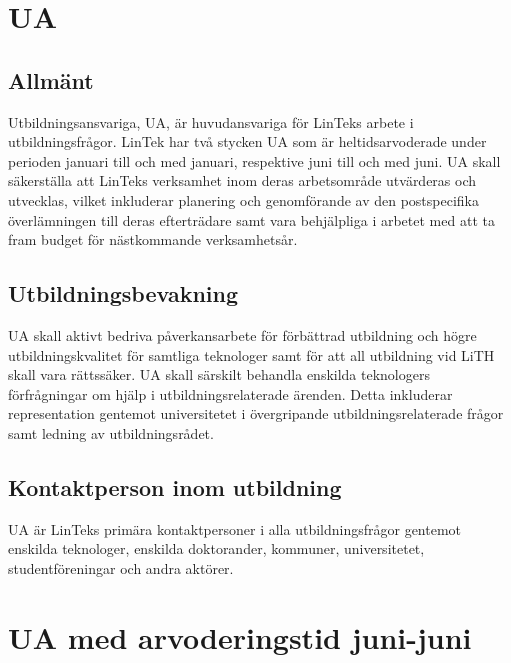 \hypertarget{ua}{%
\section{UA}\label{ua}}

\hypertarget{allmuxe4nt-3}{%
\subsection{Allmänt}\label{allmuxe4nt-3}}

Utbildningsansvariga, UA, är huvudansvariga för LinTeks arbete i
utbildningsfrågor. LinTek har två stycken UA som är heltidsarvoderade
under perioden januari till och med januari, respektive juni till och
med juni. UA skall säkerställa att LinTeks verksamhet inom deras
arbetsområde utvärderas och utvecklas, vilket inkluderar planering och
genomförande av den postspecifika överlämningen till deras efterträdare
samt vara behjälpliga i arbetet med att ta fram budget för nästkommande
verksamhetsår.

\hypertarget{utbildningsbevakning}{%
\subsection{Utbildningsbevakning}\label{utbildningsbevakning}}

UA skall aktivt bedriva påverkansarbete för förbättrad utbildning och
högre utbildningskvalitet för samtliga teknologer samt för att all
utbildning vid LiTH skall vara rättssäker. UA skall särskilt behandla
enskilda teknologers förfrågningar om hjälp i utbildningsrelaterade
ärenden. Detta inkluderar representation gentemot universitetet i
övergripande utbildningsrelaterade frågor samt ledning av
utbildningsrådet.

\hypertarget{kontaktperson-inom-utbildning}{%
\subsection{Kontaktperson inom
utbildning}\label{kontaktperson-inom-utbildning}}

UA är LinTeks primära kontaktpersoner i alla utbildningsfrågor gentemot
enskilda teknologer, enskilda doktorander, kommuner, universitetet,
studentföreningar och andra aktörer.

\hypertarget{ua-med-arvoderingstid-juni-juni}{%
\section{UA med arvoderingstid
juni-juni}\label{ua-med-arvoderingstid-juni-juni}}

